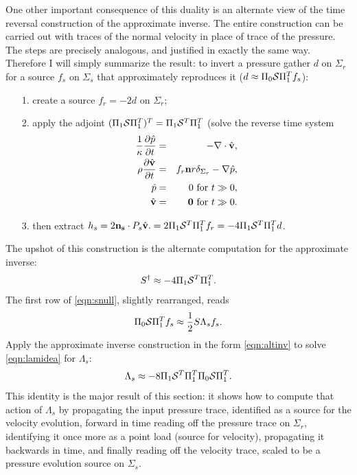 \documentclass[12pt]{geophysics}
\newcommand{\bv}{\mathbf{v}}
\begin{document}
One other important consequence of this duality is an alternate view
of the time reversal construction of the approximate inverse. The
entire construction can be carried out with traces of the normal
velocity in place of trace of the pressure. The steps are precisely
analogous, and justified in exactly the same way. Therefore I will
simply summarize the result:
to invert a pressure gather $d$ on $\Sigma_r$
for a source $f_s$ on $\Sigma_s$ that approximately reproduces it ($d
\approx \Pi_0{\cal S}\Pi_1^Tf_s$):
\begin{itemize}
\item[1. ] create a source $f_r = - 2d$ on $\Sigma_r$;
\item[2. ] apply the adjoint $(\Pi_1{\cal S}\Pi_1^T)^T=\Pi_1{\cal
    S}^T\Pi_1^T$ (solve the reverse time system
  \begin{eqnarray}
  \label{eqn:awerecglobvz}
  \frac{1}{\kappa}\frac{\partial\hat{p}}{\partial t} & = & 
                                                      - \nabla \cdot \hat{\bv}, \nonumber \\
  \rho\frac{\partial \hat{\bv}}{\partial t} & = & f_r {\bf n}r
  \delta_{\Sigma_r} - \nabla \hat{p}, \nonumber \\
  \hat{p} & = & 0 \mbox{ for } t\gg 0, \nonumber \\
    \hat{\bv} & = & {\bf 0} \mbox{ for } t \gg 0.
  \end{eqnarray}
\item[3. ]
  then extract $h_s=2{\bf n_s}\cdot P_s\hat{\bv}. = 2\Pi_1{\cal
    S}^T\Pi_1^Tf_r=-4\Pi_1{\cal S}^T\Pi_1^Td$.
\end{itemize}
The upshot of this construction is the alternate computation for the
approximate inverse:
\begin{equation}
  \label{eqn:altinv}
  S^{\dagger}  \approx -4\Pi_1{\cal S}^T\Pi_1^T.
\end{equation}
The first row of
\ref{eqn:snull}, slightly rearranged, reads
\begin{equation}
  \label{eqn:lamidea}
  \Pi_0{\cal S}\Pi_1^T f_s \approx  \frac{1}{2} S\Lambda_sf_s.
\end{equation}
Apply the approximate inverse construction in the form
\ref{eqn:altinv} to solve \ref{eqn:lamidea} for $\Lambda_s$:
\begin{equation}
  \label{eqn:lamident}
  \Lambda_s \approx -8\Pi_1{\cal S}^T\Pi_1^T\Pi_0 {\cal S}\Pi_1^T.
\end{equation}
This identity is the major result of this section: it shows how
to compute that action of $\Lambda_s$ by propagating the input
pressure trace, identified as a source for the velocity evolution,
forward in time 
reading off the pressure trace on $\Sigma_r$, identifying it once more as
a point load (source for velocity), propagating it backwards in time, and finally reading off the velocity trace, scaled to be a
pressure evolution source on $\Sigma_s$. 
\end{document}
